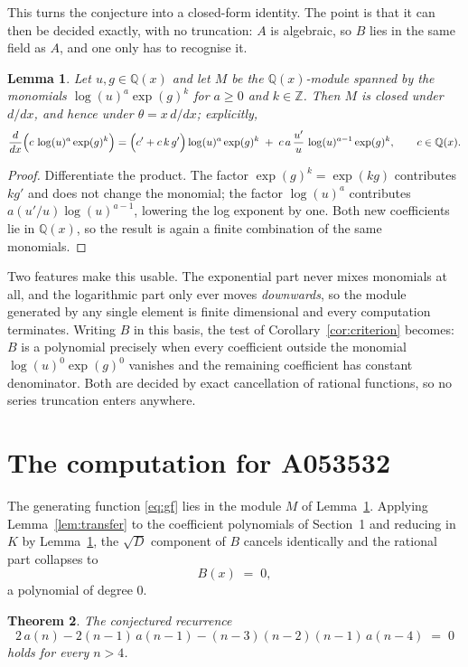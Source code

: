 \documentclass[11pt,a4paper]{article}
\theoremstyle{plain}
\newtheorem{theorem}{Theorem}
\newtheorem{lemma}[theorem]{Lemma}
\theoremstyle{definition}
\begin{document}
This turns the conjecture into a closed-form identity. The point is that it can then be
decided exactly, with no truncation: $A$ is algebraic, so $B$ lies in the same field as
$A$, and one only has to recognise it.

\begin{lemma}\label{lem:field}
Let $u,g\in\mathbb{Q}(x)$ and let $M$ be the $\mathbb{Q}(x)$-module spanned by the
monomials $\log(u)^{a}\exp(g)^{k}$ for $a\ge0$ and $k\in\mathbb{Z}$. Then $M$ is closed
under $d/dx$, and hence under $\theta=x\,d/dx$; explicitly,
\[
\frac{d}{dx}\Bigl(c\,\log(u)^{a}\exp(g)^{k}\Bigr)
=\Bigl(c'+c\,k\,g'\Bigr)\log(u)^{a}\exp(g)^{k}
\;+\;c\,a\,\frac{u'}{u}\,\log(u)^{a-1}\exp(g)^{k},
\qquad c\in\mathbb{Q}(x).
\]
\end{lemma}

\begin{proof}
Differentiate the product. The factor $\exp(g)^{k}=\exp(kg)$ contributes $kg'$ and does
not change the monomial; the factor $\log(u)^{a}$ contributes $a(u'/u)\log(u)^{a-1}$,
lowering the log exponent by one. Both new coefficients lie in $\mathbb{Q}(x)$, so the
result is again a finite combination of the same monomials.
\end{proof}

Two features make this usable. The exponential part never mixes monomials at all, and the
logarithmic part only ever moves \emph{downwards}, so the module generated by any single
element is finite dimensional and every computation terminates. Writing $B$ in this basis,
the test of Corollary~\ref{cor:criterion} becomes: $B$ is a polynomial precisely when every
coefficient outside the monomial $\log(u)^{0}\exp(g)^{0}$ vanishes and the remaining
coefficient has constant denominator. Both are decided by exact cancellation of rational
functions, so no series truncation enters anywhere.

\section{The computation for A053532}

The generating function \eqref{eq:gf} lies in the module $M$ of
Lemma~\ref{lem:field}.
Applying Lemma~\ref{lem:transfer} to the coefficient polynomials of Section~1 and reducing
in $K$ by Lemma~\ref{lem:field}, the $\sqrt{D}$ component of $B$ cancels identically and
the rational part collapses to
\[
B(x)\;=\;0 ,
\]
a polynomial of degree $0$.

\begin{theorem}
The conjectured recurrence
\[
2\,a(n) -  2 \left(n - 1\right)\,a(n-1) -  \left(n - 3\right) \left(n - 2\right) \left(n - 1\right)\,a(n-4) \;=\;0
\]
holds for every $n>4$.
\end{theorem}
\end{document}

